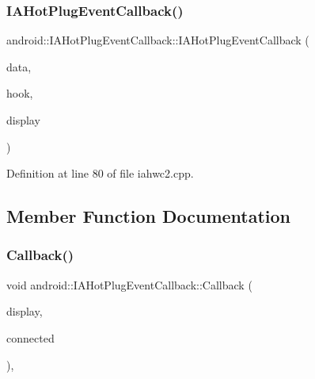 \subsubsection{\texorpdfstring{I\+A\+Hot\+Plug\+Event\+Callback()}{IAHotPlugEventCallback()}\hspace{0.1cm}{\footnotesize\ttfamily [2/2]}}
{\footnotesize\ttfamily android\+::\+I\+A\+Hot\+Plug\+Event\+Callback\+::\+I\+A\+Hot\+Plug\+Event\+Callback (\begin{DoxyParamCaption}\item[{hwc2\+\_\+callback\+\_\+data\+\_\+t}]{data,  }\item[{hwc2\+\_\+function\+\_\+pointer\+\_\+t}]{hook,  }\item[{\mbox{\hyperlink{classandroid_1_1IAHWC2_1_1HwcDisplay}{I\+A\+H\+W\+C2\+::\+Hwc\+Display}} $\ast$}]{display }\end{DoxyParamCaption})\hspace{0.3cm}{\ttfamily [inline]}}



Definition at line 80 of file iahwc2.\+cpp.


\begin{DoxyCode}{0}
\end{DoxyCode}


\subsection{Member Function Documentation}
\mbox{\label{classandroid_1_1IAHotPlugEventCallback_a8808ed272ecfd7006c28f0e54d6ba9e4}} 
\subsubsection{\texorpdfstring{Callback()}{Callback()}\hspace{0.1cm}{\footnotesize\ttfamily [1/2]}}
{\footnotesize\ttfamily void android\+::\+I\+A\+Hot\+Plug\+Event\+Callback\+::\+Callback (\begin{DoxyParamCaption}\item[{uint32\+\_\+t}]{display,  }\item[{bool}]{connected }\end{DoxyParamCaption})\hspace{0.3cm}{\ttfamily [inline]}, {\ttfamily [virtual]}}



